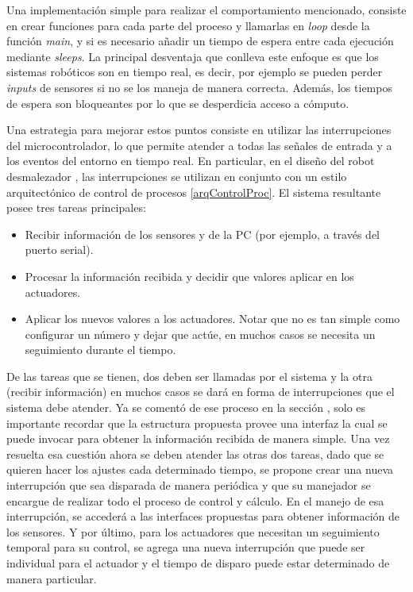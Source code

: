Una implementación simple para realizar el comportamiento mencionado, consiste en crear funciones para cada parte del proceso y llamarlas en \textit{loop} desde la función \textit{main}, y si es necesario añadir un tiempo de espera entre cada ejecución mediante \textit{sleeps}. La principal desventaja que conlleva este enfoque es que los sistemas robóticos son en tiempo real, es decir, por ejemplo se pueden perder \textit{inputs} de sensores si no se los maneja de manera correcta. Además, los tiempos de espera son bloqueantes por lo que se desperdicia acceso a cómputo.

Una estrategia para mejorar estos puntos consiste en utilizar las interrupciones del microcontrolador, lo que permite atender a todas las señales de entrada y a los eventos del entorno en tiempo real. En particular, en el diseño del robot desmalezador \cite{paperPomponio}, las interrupciones se utilizan en conjunto con un estilo arquitectónico de control de procesos \ref{arqControlProc}. El sistema resultante posee tres tareas principales:

\begin{itemize}
    \item Recibir información de los sensores y de la PC (por ejemplo, a través del puerto serial).
    \item Procesar la información recibida y decidir que valores aplicar en los actuadores.
    \item Aplicar los nuevos valores a los actuadores. Notar que no es tan simple como configurar un número y dejar que actúe, en muchos casos se necesita un seguimiento durante el tiempo.
\end{itemize}

De las tareas que se tienen, dos deben ser llamadas por el sistema y la otra (recibir información) en muchos casos se dará en forma de interrupciones que el sistema debe atender. Ya se comentó de ese proceso en la sección , solo es importante recordar que la estructura propuesta provee una interfaz la cual se puede invocar para obtener la información recibida de manera simple. Una vez resuelta esa cuestión ahora se deben atender las otras dos tareas, dado que se quieren hacer los ajustes cada determinado tiempo, se propone crear una nueva interrupción que sea disparada de manera periódica y que su manejador se encargue de realizar todo el proceso de control y cálculo. En el manejo de esa interrupción, se accederá a las interfaces propuestas para obtener información de los sensores. Y por último, para los actuadores que necesitan un seguimiento temporal para su control, se agrega una nueva interrupción que puede ser individual para el actuador y el tiempo de disparo puede estar determinado de manera particular.

